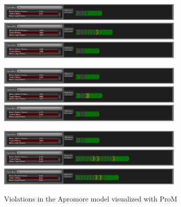\begin{figure}[H]
\centering
\includegraphics[width=0.8\textwidth]{figures/violation_case/10-apromore.png}
\includegraphics[width=0.8\textwidth]{figures/violation_case/20-apromore.png}
\includegraphics[width=0.8\textwidth]{figures/violation_case/47-apromore.png}

\includegraphics[width=0.8\textwidth]{figures/violation_case/53-apromore.png}
\includegraphics[width=0.8\textwidth]{figures/violation_case/63-apromore.png}
\includegraphics[width=0.8\textwidth]{figures/violation_case/88-apromore.png}

\includegraphics[width=0.8\textwidth]{figures/violation_case/6-apromore.png}
\includegraphics[width=0.8\textwidth]{figures/violation_case/72-apromore.png}
\includegraphics[width=0.8\textwidth]{figures/violation_case/81-apromore.png}
\caption{Violations in the Apromore model visualized with ProM}
\label{fig:violations_apromore}
\end{figure}

